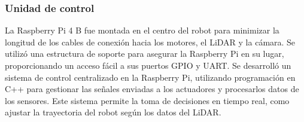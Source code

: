     \subsubsection{Unidad de control}
    La Raspberry Pi 4 B fue montada en el centro del robot para minimizar la longitud de
        los cables de conexi\'on hacia los motores, el LiDAR y la c\'amara. Se utiliz\'o una
        estructura de soporte para asegurar la Raspberry Pi en su lugar, proporcionando un
        acceso f\'acil a sus puertos GPIO y UART.
    \vskip 0.5cm
    Se desarroll\'o un sistema de control centralizado en la Raspberry Pi, utilizando
        programaci\'on en C++ para gestionar las se\~nales enviadas a los actuadores y procesarlos datos de los sensores. Este sistema permite la toma de decisiones en tiempo real,
        como ajustar la trayectoria del robot seg\'un los datos del LiDAR.
    \vskip 0.5cm
